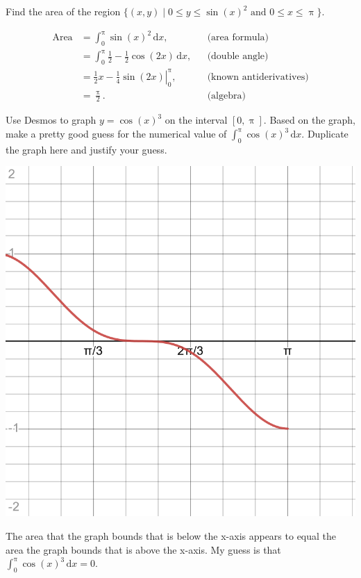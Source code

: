 \documentclass[12pt,fleqn,answers]{exam}
\begin{document}
\begin{questions} 

\question [2] Find the area of the region $\{(x,y) \mid 0 \leq y \leq \sin(x)^2 \mbox{ and } 0 \leq x \leq \uppi \}$.

\begin{solution}[2.5in]
    \begin{align*} \text{Area} &= \int_0^\uppi \sin(x)^2 \, \mathrm{d} x, && \text{(area formula)} \\
                               &= \int_0^\uppi \frac{1}{2} - \frac{1}{2} \cos(2 x) \, \mathrm{d} x, && \text{(double angle)} \\
                               &= \left. \frac{1}{2} x  - \frac{1}{4} \sin(2 x) \right |_{0}^\uppi, && \text{(known antiderivatives)}\\
                               &= \frac{\uppi}{2}. && \text{(algebra)}
    \end{align*}
\end{solution}


\question [2] Use Desmos to graph $y = \cos(x)^3$ on the interval $[0,\uppi]$. Based 
on the graph, make a pretty good guess for the numerical value of 
$\int_0^\uppi \cos(x)^3 \, \mathrm{d} x$. Duplicate the graph here 
and justify your guess.

\begin{solution}%

    \begin{center}
     \includegraphics[scale=0.2]{desmos-graph(19).png}
    \end{center}
The area that the graph bounds that is below the x-axis appears to 
equal the area the graph bounds that is above the x-axis. My guess 
is that $\int_0^\uppi \cos(x)^3 \, \mathrm{d} x = 0$. 


\end{solution}
\end{questions}
\end{document}
